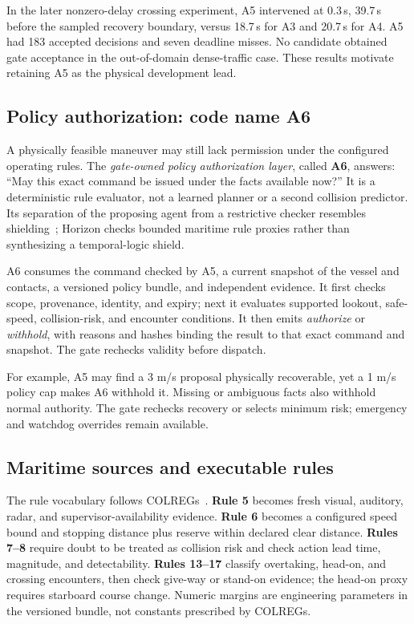 \documentclass[sigconf,nonacm]{acmart}
\begin{document}
In the later nonzero-delay crossing experiment, A5 intervened at 0.3\,s, 39.7\,s before the sampled recovery boundary, versus 18.7\,s for A3 and 20.7\,s for A4. A5 had 183 accepted decisions and seven deadline misses. No candidate obtained gate acceptance in the out-of-domain dense-traffic case. These results motivate retaining A5 as the physical development lead.


\subsection{Policy authorization: code name A6}
A physically feasible maneuver may still lack permission under the configured operating rules. The \emph{gate-owned policy authorization layer}, called \textbf{A6}, answers: ``May this exact command be issued under the facts available now?'' It is a deterministic rule evaluator, not a learned planner or a second collision predictor. Its separation of the proposing agent from a restrictive checker resembles shielding~\cite{shielding}; Horizon checks bounded maritime rule proxies rather than synthesizing a temporal-logic shield.

A6 consumes the command checked by A5, a current snapshot of the vessel and contacts, a versioned policy bundle, and independent evidence. It first checks scope, provenance, identity, and expiry; next it evaluates supported lookout, safe-speed, collision-risk, and encounter conditions. It then emits \emph{authorize} or \emph{withhold}, with reasons and hashes binding the result to that exact command and snapshot. The gate rechecks validity before dispatch.

For example, A5 may find a 3 m/s proposal physically recoverable, yet a 1 m/s policy cap makes A6 withhold it. Missing or ambiguous facts also withhold normal authority. The gate rechecks recovery or selects minimum risk; emergency and watchdog overrides remain available.

\subsection{Maritime sources and executable rules}
The rule vocabulary follows COLREGs~\cite{colregs}. \textbf{Rule 5} becomes fresh visual, auditory, radar, and supervisor-availability evidence. \textbf{Rule 6} becomes a configured speed bound and stopping distance plus reserve within declared clear distance. \textbf{Rules 7--8} require doubt to be treated as collision risk and check action lead time, magnitude, and detectability. \textbf{Rules 13--17} classify overtaking, head-on, and crossing encounters, then check give-way or stand-on evidence; the head-on proxy requires starboard course change. Numeric margins are engineering parameters in the versioned bundle, not constants prescribed by COLREGs.
\end{document}
